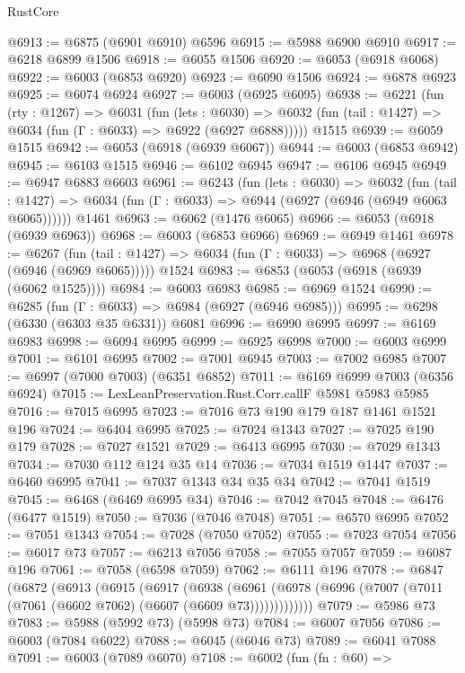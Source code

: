 \begin{lexlean}{RustCore}
\begin{coremodule}
{\begin{coremodule}
{{{{{{{{{{{{{{{{{{{{{{{{{{{{{{{{{{{{{{{{{{{{{{{@6913 := @6875 (@6901 @6910) @6596
@6915 := @5988 @6900 @6910
@6917 := @6218 @6899 @1506
@6918 := @6055 @1506
@6920 := @6053 (@6918 @6068)
@6922 := @6003 (@6853 @6920)
@6923 := @6090 @1506
@6924 := @6878 @6923
@6925 := @6074 @6924
@6927 := @6003 (@6925 @6095)
@6938 := @6221
    (fun (rty : @1267) =>
    @6031
      (fun (lets : @6030) =>
      @6032 (fun (tail : @1427) => @6034 (fun (Γ : @6033) => @6922 (@6927 @6888)))))
    @1515
@6939 := @6059 @1515
@6942 := @6053 (@6918 (@6939 @6067))
@6944 := @6003 (@6853 @6942)
@6945 := @6103 @1515
@6946 := @6102 @6945
@6947 := @6106 @6945
@6949 := @6947 @6883 @6603
@6961 := @6243
    (fun (lets : @6030) =>
    @6032
      (fun (tail : @1427) => @6034 (fun (Γ : @6033) => @6944 (@6927 (@6946 (@6949 @6063 @6065))))))
    @1461
@6963 := @6062 (@1476 @6065)
@6966 := @6053 (@6918 (@6939 @6963))
@6968 := @6003 (@6853 @6966)
@6969 := @6949 @1461
@6978 := @6267
    (fun (tail : @1427) => @6034 (fun (Γ : @6033) => @6968 (@6927 (@6946 (@6969 @6065)))))
    @1524
@6983 := @6853 (@6053 (@6918 (@6939 (@6062 @1525))))
@6984 := @6003 @6983
@6985 := @6969 @1524
@6990 := @6285 (fun (Γ : @6033) => @6984 (@6927 (@6946 @6985)))
@6995 := @6298 (@6330 (@6303 @35 @6331)) @6081
@6996 := @6990 @6995
@6997 := @6169 @6983
@6998 := @6094 @6995
@6999 := @6925 @6998
@7000 := @6003 @6999
@7001 := @6101 @6995
@7002 := @7001 @6945
@7003 := @7002 @6985
@7007 := @6997 (@7000 @7003) (@6351 @6852)
@7011 := @6169 @6999 @7003 (@6356 @6924)
@7015 := LexLeanPreservation.Rust.Corr.callF @5981 @5983 @5985
@7016 := @7015 @6995
@7023 := @7016 @73 @190 @179 @187 @1461 @1521 @196
@7024 := @6404 @6995
@7025 := @7024 @1343
@7027 := @7025 @190 @179
@7028 := @7027 @1521
@7029 := @6413 @6995
@7030 := @7029 @1343
@7034 := @7030 @112 @124 @35 @14
@7036 := @7034 @1519 @1447
@7037 := @6460 @6995
@7041 := @7037 @1343 @34 @35 @34
@7042 := @7041 @1519
@7045 := @6468 (@6469 @6995 @34)
@7046 := @7042 @7045
@7048 := @6476 (@6477 @1519)
@7050 := @7036 (@7046 @7048)
@7051 := @6570 @6995
@7052 := @7051 @1343
@7054 := @7028 (@7050 @7052)
@7055 := @7023 @7054
@7056 := @6017 @73
@7057 := @6213 @7056
@7058 := @7055 @7057
@7059 := @6087 @196
@7061 := @7058 (@6598 @7059)
@7062 := @6111 @196
@7078 := @6847
    (@6872
      (@6913
        (@6915
          (@6917
            (@6938
              (@6961 (@6978 (@6996 (@7007 (@7011 (@7061 (@6602 @7062) (@6607 (@6609 @73)))))))))))))
@7079 := @5986 @73
@7083 := @5988 (@5992 @73) (@5998 @73)
@7084 := @6007 @7056
@7086 := @6003 (@7084 @6022)
@7088 := @6045 (@6046 @73)
@7089 := @6041 @7088
@7091 := @6003 (@7089 @6070)
@7108 := @6002
    (fun (fn : @60) =>
}}}}}}}}}}}}}}}}}}}}}}}}}}}}}}}}}}}}}}}}}}}}}}}
\end{coremodule}}
\end{coremodule}
\end{lexlean}
